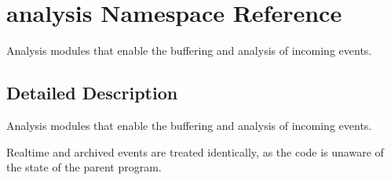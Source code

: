 \hypertarget{namespaceanalysis}{\section{analysis Namespace Reference}
\label{namespaceanalysis}
}


\begin{DoxyVerb}Analysis modules that enable the buffering and analysis
of incoming events.\end{DoxyVerb}
  




\subsection{Detailed Description}
\begin{DoxyVerb}Analysis modules that enable the buffering and analysis
of incoming events.\end{DoxyVerb}
 Realtime and archived events are treated identically, as the code is unaware of the state of the parent program. 